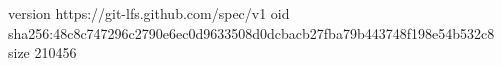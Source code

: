 version https://git-lfs.github.com/spec/v1
oid sha256:48c8c747296c2790e6ec0d9633508d0dcbacb27fba79b443748f198e54b532c8
size 210456
